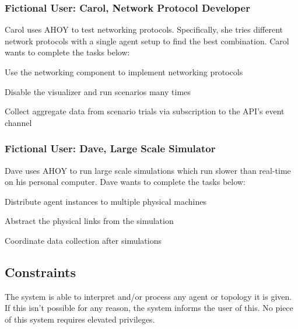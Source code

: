 \documentclass[titlepage]{article}
\begin{document}
\subsubsection{Fictional User: Carol, Network Protocol Developer%
  \label{bob}%
}

Carol uses AHOY to test networking protocols.  Specifically, she tries different network protocols with a single agent
setup to find the best combination.  Carol wants to complete the tasks below:

\begin{itemize*}
    \item Use the networking component to implement networking protocols
    \item Disable the visualizer and run scenarios many times
    \item Collect aggregate data from scenario trials via subscription to the API's event channel
\end{itemize*}

\subsubsection{Fictional User: Dave, Large Scale Simulator%
  \label{bob}%
}

Dave uses AHOY to run large scale simulations which run slower than real-time on his personal computer.  Dave wants to
complete the tasks below:

\begin{itemize*}
    \item Distribute agent instances to multiple physical machines
    \item Abstract the physical links from the simulation
    \item Coordinate data collection after simulations
\end{itemize*}

\subsection{Constraints%
  \label{constraints}%
}

The system is able to interpret and/or process any agent or topology it is given.  If this isn't possible for any reason, the system informs the user of this. No piece of this system requires elevated privileges.

\end{document}
